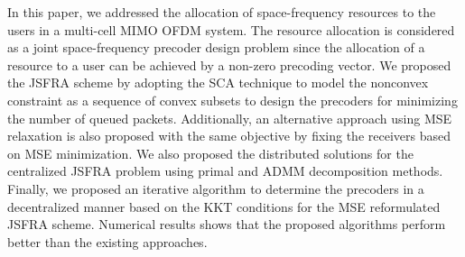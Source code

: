 
In this paper, we addressed the allocation of space-frequency resources to the users in a multi-cell \ac{MIMO} \ac{OFDM} system. The resource allocation is considered as a joint space-frequency precoder design problem since the allocation of a resource to a user can be achieved by a non-zero precoding vector. We proposed the \ac{JSFRA} scheme by adopting the \ac{SCA} technique to model the nonconvex constraint as a sequence of convex subsets to design the precoders for minimizing the number of queued packets. Additionally, an alternative approach using \ac{MSE} relaxation is also proposed with the same objective by fixing the receivers based on \ac{MSE} minimization. We also proposed the distributed solutions for the centralized \ac{JSFRA} problem using primal and \ac{ADMM} decomposition methods. Finally, we proposed an iterative algorithm to determine the precoders in a decentralized manner based on the \ac{KKT} conditions for the \ac{MSE} reformulated \ac{JSFRA} scheme. Numerical results shows that the proposed algorithms perform better than the existing approaches.